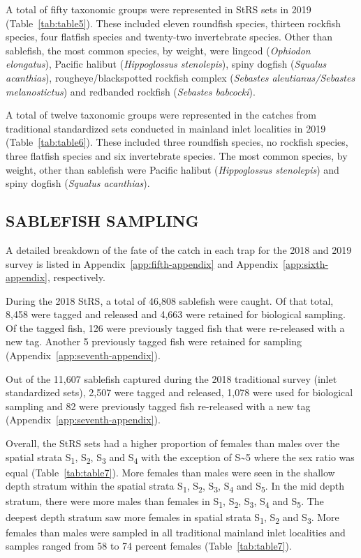 \documentclass[12pt]{article}\usepackage[]{graphicx}\usepackage[]{color}
\begin{document}
A total of fifty taxonomic groups were represented in StRS sets in 2019 (Table~\ref{tab:table5}). These included eleven roundfish species, thirteen rockfish species, four flatfish species and twenty-two invertebrate species. Other than sablefish, the most common species, by weight, were lingcod (\emph{Ophiodon elongatus}), Pacific halibut (\emph{Hippoglossus stenolepis}), spiny dogfish (\emph{Squalus acanthias}), rougheye/blackspotted rockfish complex (\emph{Sebastes aleutianus/Sebastes melanostictus}) and redbanded rockfish (\emph{Sebastes babcocki}).

A total of twelve taxonomic groups were represented in the catches from traditional standardized sets conducted in mainland inlet localities in 2019 (Table~\ref{tab:table6}). These included three roundfish species, no rockfish species, three flatfish species and six invertebrate species. The most common species, by weight, other than sablefish were Pacific halibut (\emph{Hippoglossus stenolepis}) and spiny dogfish (\emph{Squalus acanthias}).

\hypertarget{sablefish-sampling}{%
\subsection{SABLEFISH SAMPLING}\label{sablefish-sampling}}

A detailed breakdown of the fate of the catch in each trap for the 2018 and 2019 survey is listed in Appendix~\ref{app:fifth-appendix} and Appendix~\ref{app:sixth-appendix}, respectively.

During the 2018 StRS, a total of 46,808 sablefish were caught. Of that total, 8,458 were tagged and released and 4,663 were retained for biological sampling. Of the tagged fish, 126 were previously tagged fish that were re-released with a new tag. Another 5 previously tagged fish were retained for sampling (Appendix~\ref{app:seventh-appendix}).

Out of the 11,607 sablefish captured during the 2018 traditional survey (inlet standardized sets), 2,507 were tagged and released, 1,078 were used for biological sampling and 82 were previously tagged fish re-released with a new tag (Appendix~\ref{app:seventh-appendix}).

Overall, the StRS sets had a higher proportion of females than males over the spatial strata S\textsubscript{1}, S\textsubscript{2}, S\textsubscript{3} and S\textsubscript{4} with the exception of S\textasciitilde5 where the sex ratio was equal (Table~\ref{tab:table7}). More females than males were seen in the shallow depth stratum within the spatial strata S\textsubscript{1}, S\textsubscript{2}, S\textsubscript{3}, S\textsubscript{4} and S\textsubscript{5}. In the mid depth stratum, there were more males than females in S\textsubscript{1}, S\textsubscript{2}, S\textsubscript{3}, S\textsubscript{4} and S\textsubscript{5}. The deepest depth stratum saw more females in spatial strata S\textsubscript{1}, S\textsubscript{2} and S\textsubscript{3}. More females than males were sampled in all traditional mainland inlet localities and samples ranged from 58 to 74 percent females (Table~\ref{tab:table7}).
\end{document}
